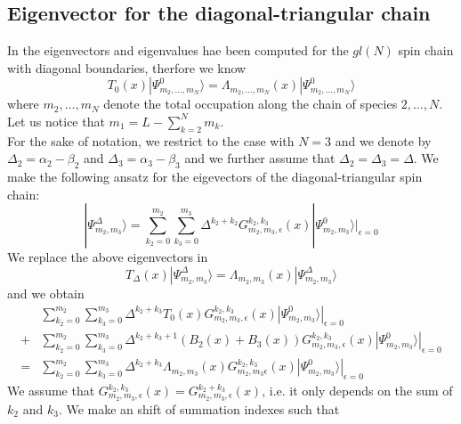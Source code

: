 \documentclass[11pt]{article}
\numberwithin{equation}{section}
\numberwithin{equation}{subsection}
\begin{document}
\subsection{Eigenvector for the diagonal-triangular chain}
In \cite{belliard2011nested}  the eigenvectors and eigenvalues hae been computed for the $gl(N)$ spin chain with diagonal boundaries, therfore we know 
\begin{equation}
T_{0}(x)|\Psi_{m_{2},\ldots,m_{N}}^{0}\rangle =\Lambda_{m_{2},\ldots,m_{N}}(x)|\Psi_{m_{2},\ldots,m_{N}}^{0}\rangle
\end{equation}
where $m_{2},\ldots,m_{N}$ denote the total occupation along the chain of species $2,\ldots,N$. Let us notice that $m_{1}=L-\sum_{k=2}^{N}m_{k}$.\\
For the sake of notation, we restrict to the case with $N=3$ and we denote by $\Delta_{2}=\alpha_{2}-\beta_{2}$ and $\Delta_{3}=\alpha_{3}-\beta_{3}$ and we further assume that $\Delta_{2}=\Delta_{3}=\Delta$. 
We make the following ansatz for the eigevectors of the diagonal-triangular spin chain:
\begin{equation}\label{ansatzEigenvectorDelta}
|\Psi_{m_{2},m_{3}}^{\Delta}\rangle=\sum_{k_{2}=0}^{m_{2}}\sum_{k_{3}=0}^{m_{3}}\Delta^{k_{2}+k_{2}}G_{m_{2},m_{3},\epsilon}^{k_{2},k_{3}}(x)|\Psi_{m_{2},m_{3}}^{0}\rangle|_{\epsilon=0}
\end{equation}
We replace the above eigenvectors in 
\begin{equation}\label{eigDELTA}
T_{\Delta}(x)|\Psi_{m_{2},m_{3}}^{\Delta}\rangle=\Lambda_{m_{2},m_{3}}(x)|\Psi_{m_{2},m_{3}}^{\Delta}\rangle
\end{equation}
and we obtain
\begin{align*}
&\sum_{k_{2}=0}^{m_{2}}\sum_{k_{3}=0}^{m_{3}}\Delta^{k_{2}+k_{3}}T_{0}(x)G_{m_{2},m_{3},\epsilon}^{k_{2},k_{3}}(x) |\Psi_{m_{2},m_{3}}^{0}\rangle|_{\epsilon=0}
\\+&
\sum_{k_{2}=0}^{m_{2}}\sum_{k_{3}=0}^{m_{3}}\Delta^{k_{2}+k_{3}+1}\left(B_{2}(x)+B_{3}(x)\right)G_{m_{2},m_{3},\epsilon}^{k_{2},k_{3}}(x)|\Psi_{m_{2},m_{3}}^{0}\rangle|_{\epsilon=0}
\\=&
\sum_{k_{2}=0}^{m_{2}}\sum_{k_{3}=0}^{m_{3}}\Delta^{k_{2}+k_{3}}\Lambda_{m_{2},m_{3}}(x)G_{m_{2},m_{3}\epsilon}^{k_{2},k_{3}}(x)|\Psi_{m_{2},m_{3}}^{0}\rangle|_{\epsilon=0}
\end{align*}
We assume that $G_{m_{2},m_{3},\epsilon}^{k_{2},k_{3}}(x)=G_{m_{2},m_{3},\epsilon}^{k_{2}+k_{3}}(x)$, i.e. it only depends on the sum of $k_{2}$ and $k_{3}$. We make an shift of summation indexes such that 
\end{document}
